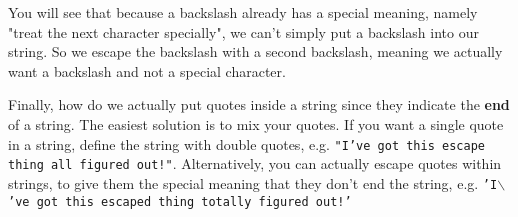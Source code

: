 You will see that because a backslash already has a special meaning,   namely "treat the next character specially", we can't simply put a   backslash into our string. So we escape the backslash with a second   backslash, meaning we actually want a backslash and not a special   character.

Finally, how do we actually put quotes inside a string since they   indicate the \textbf{end} of a string. The easiest solution is   to mix your quotes. If you want a single quote in a string, define the   string with double quotes, e.g.  
\texttt{"I've got this escape thing all figured out!"}. Alternatively, you can actually escape quotes   within strings, to give them the special meaning that they don't end   the string, e.g. 
\texttt{'I$\backslash$'ve got this escaped thing totally figured out!'}

